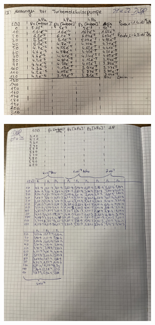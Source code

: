 \begin{figure}
    \centering
    \includegraphics[width=0.7\textwidth]{abb/IMG_3228.jpg}
\end{figure}
\begin{figure}
    \centering
    \includegraphics[width=0.7\textwidth]{abb/IMG_3229.jpg}
\end{figure}